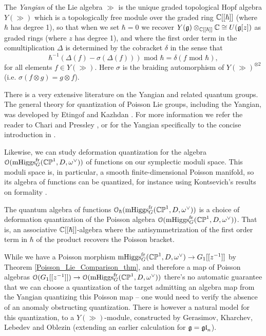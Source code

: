 \documentclass[10pt, oneside]{article}
\DeclareMathOperator{\mhiggs}{mHiggs}
\newcommand{\fr}{\mathrm{fr}}
\begin{document}
\begin{definition}
The \emph{Yangian} of the Lie algebra $\gg$ is the unique graded topological Hopf algebra $Y(\gg)$ which is a topologically free module over the graded ring $\mathbb{C}[[\hbar]]$ (where $\hbar$ has degree 1), so that when we set $\hbar=0$ we recover $Y(\mathfrak{g}) \otimes_{\mathbb{C}[[\hbar]]} \mathbb{C} \cong U(\mathfrak{g}[z])$ as graded rings (where $z$ has degree 1), and where the first order term in the comultiplication $\Delta$ is determined by the cobracket $\delta$ in the sense that
\[\hbar^{-1}(\Delta(f) - \sigma(\Delta(f))) \text{ mod } \hbar = \delta(f \text{ mod } \hbar),\]
for all elements $f \in Y(\gg)$.  Here $\sigma$ is the braiding automorphism of $Y(\gg)^{\otimes 2}$ (i.e. $\sigma(f \otimes g) = g \otimes f$).
\end{definition}

There is a very extensive literature on the Yangian and related quantum groups.  The general theory for quantization of Poisson Lie groups, including the Yangian, was developed by Etingof and Kazhdan \cite{EgingofKazhdanIII}.  For more information we refer the reader to Chari and Pressley \cite{ChariPressley}, or for the Yangian specifically to the concise introduction in \cite[Section 9]{CostelloYangian}.

Likewise, we can study deformation quantization for the algebra $\OO(\mhiggs^\fr_G(\bb{CP}^1,D,\omega^\vee))$ of functions on our symplectic moduli space.  This moduli space is, in particular, a smooth finite-dimensional Poisson manifold, so its algebra of functions can be quantized, for instance using Kontsevich's results on formality \cite{KontsevichQuantization}.

\begin{definition}
The quantum algebra of functions $\OO_\hbar(\mhiggs^\fr_G(\bb{CP}^1,D,\omega^\vee))$ is a choice of deformation quantization of the Poisson algebra $\OO(\mhiggs^\fr_G(\bb{CP}^1,D,\omega^\vee))$.  That is, an associative $\mathbb{C}[[\hbar]]$-algebra where the antisymmetrization of the first order term in $\hbar$ of the product recovers the Poisson bracket. 
\end{definition}

While we have a Poisson morphism $\mhiggs^\fr_G(\bb{CP}^1,D,\omega^\vee) \to G_1[[z^{-1}]]$ by Theorem \ref{Poisson_Lie_Comparison_thm}, and therefore a map of Poisson algebras $\OO(G_1[[z^{-1}]]) \to \OO(\mhiggs^\fr_G(\bb{CP}^1,D,\omega^\vee))$ there's no automatic guarantee that we can choose a quantization of the target admitting an algebra map from the Yangian quantizing this Poisson map -- one would need to verify the absence of an anomaly obstructing quantization.  There is however a natural model for this quantization, to a $Y(\gg)$-module,  constructed by Gerasimov, Kharchev, Lebedev and Oblezin \cite{GKLO} (extending an earlier calculation \cite{GKL} for $\mathfrak{g} = \mathfrak{gl}_n$).
\end{document}
